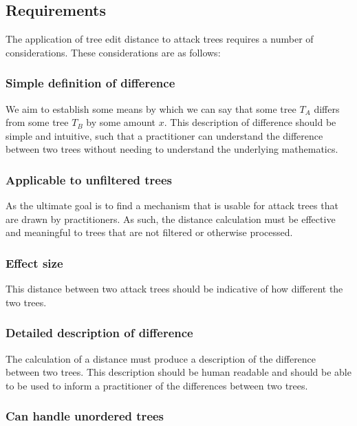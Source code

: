\subsection{Requirements}
\label{ssec:requirements}

The application of tree edit distance to attack trees requires a number of considerations. These considerations are as follows:

\subsubsection{Simple definition of difference}

We aim to establish some means by which we can say that some tree $T_A$ differs from some tree $T_B$ by some amount $x$. This description of difference should be simple and intuitive, such that a practitioner can understand the difference between two trees without needing to understand the underlying mathematics.

\subsubsection{Applicable to unfiltered trees}

As the ultimate goal is to find a mechanism that is usable for attack trees that are drawn by practitioners. As such, the distance calculation must be effective and meaningful to trees that are not filtered or otherwise processed. 

\subsubsection{Effect size}

This distance between two attack trees should be indicative of how different the two trees. 


\subsubsection{Detailed description of difference}

The calculation of a distance must produce a description of the difference between two trees. This description should be human readable and should be able to be used to inform a practitioner of the differences between two trees.

\subsubsection{Can handle unordered trees}


